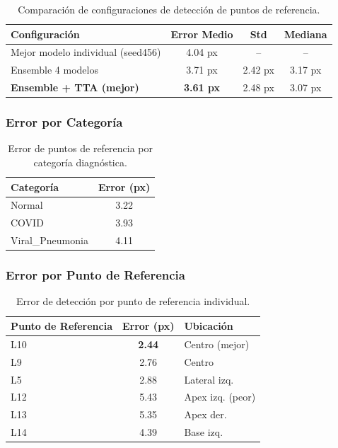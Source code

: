 \documentclass[12pt,a4paper]{article}
\begin{document}
\begin{table}[H]
\centering
\begin{tabular}{lccc}
\toprule
\textbf{Configuración} & \textbf{Error Medio} & \textbf{Std} & \textbf{Mediana} \\
\midrule
Mejor modelo individual (seed456) & 4.04 px & -- & -- \\
Ensemble 4 modelos & 3.71 px & 2.42 px & 3.17 px \\
\textbf{Ensemble + TTA (mejor)} & \textbf{3.61 px} & 2.48 px & 3.07 px \\
\bottomrule
\end{tabular}
\caption{Comparación de configuraciones de detección de puntos de referencia.}
\end{table}

\subsubsection{Error por Categoría}

\begin{table}[H]
\centering
\begin{tabular}{lc}
\toprule
\textbf{Categoría} & \textbf{Error (px)} \\
\midrule
Normal & 3.22 \\
COVID & 3.93 \\
Viral\_Pneumonia & 4.11 \\
\bottomrule
\end{tabular}
\caption{Error de puntos de referencia por categoría diagnóstica.}
\end{table}

\subsubsection{Error por Punto de Referencia}

\begin{table}[H]
\centering
\begin{tabular}{lcl}
\toprule
\textbf{Punto de Referencia} & \textbf{Error (px)} & \textbf{Ubicación} \\
\midrule
L10 & \textbf{2.44} & Centro (mejor) \\
L9 & 2.76 & Centro \\
L5 & 2.88 & Lateral izq. \\
L12 & 5.43 & Apex izq. (peor) \\
L13 & 5.35 & Apex der. \\
L14 & 4.39 & Base izq. \\
\bottomrule
\end{tabular}
\caption{Error de detección por punto de referencia individual.}
\end{table}
\end{document}
